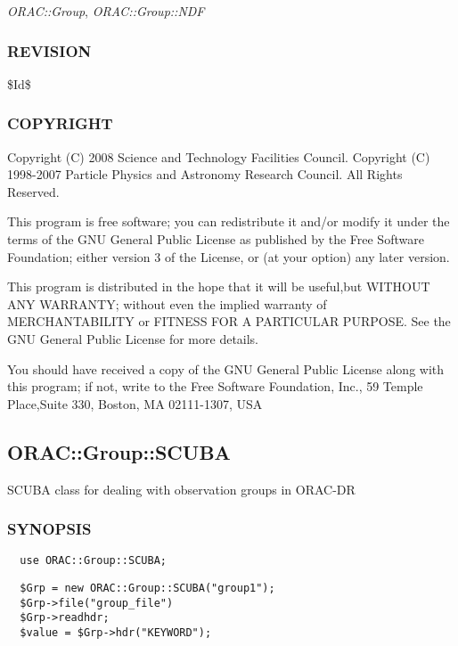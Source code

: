 \begin{description}
\begin{description}
\emph{ORAC::Group}, \emph{ORAC::Group::NDF}

\subsubsection*{REVISION\label{ORAC::Group::UFTI_REVISION}}


\$Id\$

\subsubsection*{COPYRIGHT\label{ORAC::Group::UFTI_COPYRIGHT}}


Copyright (C) 2008 Science and Technology Facilities Council.
Copyright (C) 1998-2007 Particle Physics and Astronomy Research
Council. All Rights Reserved.



This program is free software; you can redistribute it and/or modify it under
the terms of the GNU General Public License as published by the Free Software
Foundation; either version 3 of the License, or (at your option) any later
version.



This program is distributed in the hope that it will be useful,but WITHOUT ANY
WARRANTY; without even the implied warranty of MERCHANTABILITY or FITNESS FOR A
PARTICULAR PURPOSE. See the GNU General Public License for more details.



You should have received a copy of the GNU General Public License along with
this program; if not, write to the Free Software Foundation, Inc., 59 Temple
Place,Suite 330, Boston, MA  02111-1307, USA

\subsection{ORAC::Group::SCUBA\label{ORAC::Group::SCUBA}}


SCUBA class for dealing with observation groups in ORAC-DR

\subsubsection*{SYNOPSIS\label{ORAC::Group::SCUBA_SYNOPSIS}}
\begin{verbatim}
  use ORAC::Group::SCUBA;
\end{verbatim}
\begin{verbatim}
  $Grp = new ORAC::Group::SCUBA("group1");
  $Grp->file("group_file")
  $Grp->readhdr;
  $value = $Grp->hdr("KEYWORD");
\end{verbatim}

\end{description}
\end{description}
